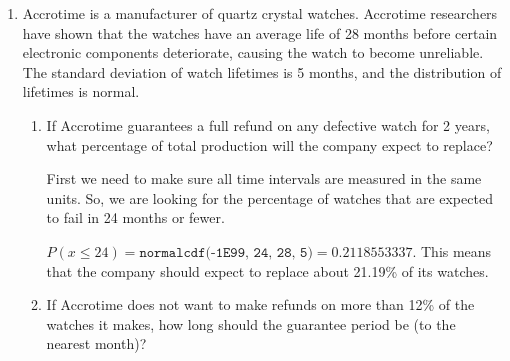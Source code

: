 \documentclass[11pt]{article}
\newcommand{\answer}[1]{\color{white}#1}
\begin{document}
\begin{enumerate}
\begin{enumerate}
	\vspace{0.5cm}
	\end{enumerate}

\item Accrotime is a manufacturer of quartz crystal watches. Accrotime researchers have shown that the watches have an average life of 28 months before certain electronic components deteriorate, causing the watch to become unreliable.  The standard deviation of watch lifetimes is 5 months, and the distribution of lifetimes is normal.

	\begin{enumerate}
	
	\item If Accrotime guarantees a full refund on any defective watch for 2 years, what percentage of total production will the company expect to replace? 
	
	{\answer First we need to make sure all time intervals are measured in the same units.  So, we are looking for the percentage of watches that are expected to fail in 24 months or fewer. 
	
	$P(x\leq 24) = \texttt{normalcdf(-1E99, 24, 28, 5)} = 0.2118553337$.  This means that the company should expect to replace about 21.19\% of its watches.
	} 

	\item If Accrotime does not want to make refunds on more than 12\% of the watches it makes, how long should the guarantee period be (to the nearest month)? 
	

\end{enumerate}
\end{enumerate}
\end{document}
